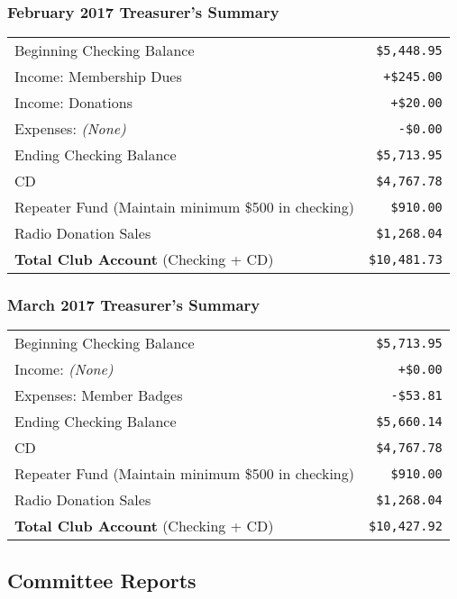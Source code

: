 \documentclass[10pt,letterpaper]{article}
\begin{document}
\subsubsection{February 2017 Treasurer's Summary}
\noindent
\begin{tabular}{|l|r|}
  \hline
  Beginning Checking Balance & \texttt{\$5,448.95} \\
  Income: Membership Dues & \texttt{+\$245.00} \\
  Income: Donations & \texttt{+\$20.00} \\
  Expenses: \emph{(None)} & \texttt{-\$0.00} \\
  Ending Checking Balance & \texttt{\$5,713.95} \\
  \hline
  \hline
  CD & \texttt{\$4,767.78} \\
  \hline
  \hline
  Repeater Fund (Maintain minimum \$500 in checking) & \texttt{\$910.00} \\
  \hline
  \hline
  Radio Donation Sales & \texttt{\$1,268.04} \\
  \hline
  \hline
  \textbf{Total Club Account} (Checking + CD) & \texttt{\$10,481.73} \\
  \hline
\end{tabular}

\subsubsection{March 2017 Treasurer's Summary}
\noindent
\begin{tabular}{|l|r|}
  \hline
  Beginning Checking Balance & \texttt{\$5,713.95} \\
  Income: \emph{(None)} & \texttt{+\$0.00} \\
  Expenses: Member Badges & \texttt{-\$53.81} \\
  Ending Checking Balance & \texttt{\$5,660.14} \\
  \hline
  \hline
  CD & \texttt{\$4,767.78} \\
  \hline
  \hline
  Repeater Fund (Maintain minimum \$500 in checking) & \texttt{\$910.00} \\
  \hline
  \hline
  Radio Donation Sales & \texttt{\$1,268.04} \\
  \hline
  \hline
  \textbf{Total Club Account} (Checking + CD) & \texttt{\$10,427.92} \\
  \hline
\end{tabular}

\subsection{Committee Reports}
\end{document}
